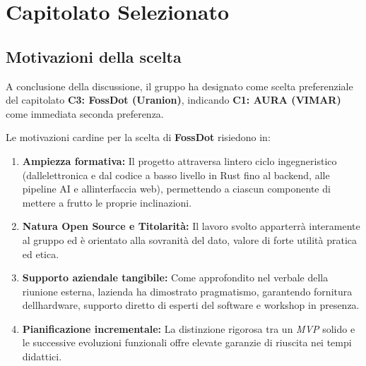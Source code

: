 \documentclass[12pt,a4paper]{article}
\newcommand{\tightlist}{\setlength{\itemsep}{1pt}\setlength{\parskip}{0pt}}
\begin{document}
\hypertarget{capitolato-selezionato}{%
\section{Capitolato Selezionato}}


\hypertarget{motivazioni-della-scelta}{%
\subsection{Motivazioni della scelta}} 
A conclusione della discussione, il gruppo ha designato come scelta preferenziale del capitolato \textbf{C3: FossDot (Uranion)}, indicando \textbf{C1: AURA (VIMAR)} come immediata seconda preferenza.

Le motivazioni cardine per la scelta di \textbf{FossDot} risiedono in:
\begin{enumerate}
\tightlist
\item \textbf{Ampiezza formativa:} Il progetto attraversa l\textquotesingle{}intero ciclo ingegneristico (dall\textquotesingle{}elettronica e dal codice a basso livello in Rust fino al backend, alle pipeline AI e all\textquotesingle{}interfaccia web), permettendo a ciascun componente di mettere a frutto le proprie inclinazioni.
\item \textbf{Natura Open Source e Titolarità:} Il lavoro svolto apparterrà interamente al gruppo ed è orientato alla sovranità del dato, valore di forte utilità pratica ed etica.
\item \textbf{Supporto aziendale tangibile:} Come approfondito nel verbale della riunione esterna, l\textquotesingle{}azienda ha dimostrato pragmatismo, garantendo fornitura dell\textquotesingle{}hardware, supporto diretto di esperti del software e workshop in presenza.
\item \textbf{Pianificazione incrementale:} La distinzione rigorosa tra un \emph{MVP} solido e le successive evoluzioni funzionali offre elevate garanzie di riuscita nei tempi didattici.
\end{enumerate}
\end{document}
